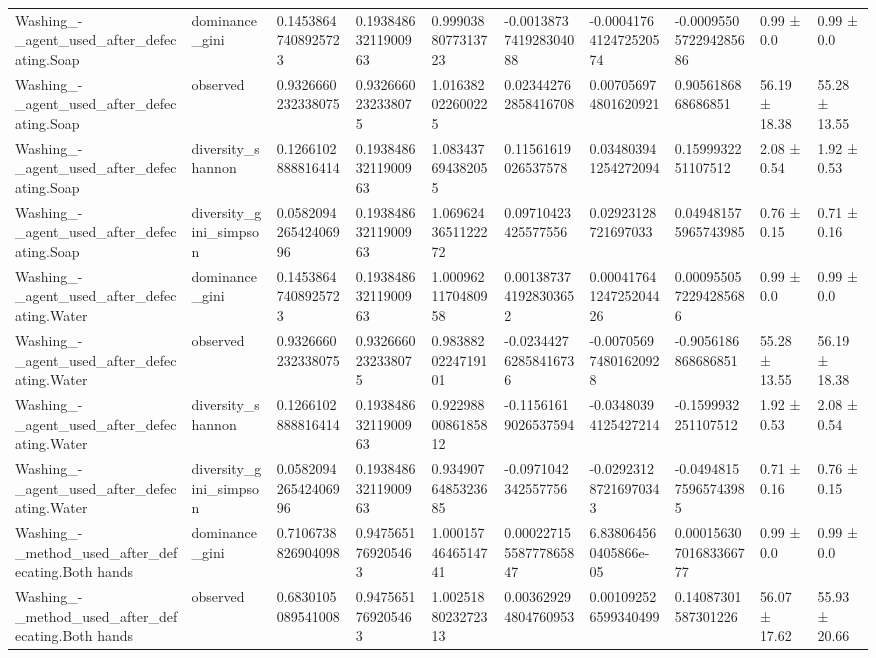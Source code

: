 \begin{longtable}{llllllllll}
Washing\_-\_agent\_used\_after\_defecating.Soap & dominance\_gini & 0.14538647408925723 & 0.19384863211900963 & 0.9990388077313723 & -0.0013873741928304088 & -0.0004176412472520574 & -0.0009550572294285686 & 0.99 ± 0.0 & 0.99 ± 0.0 \\
Washing\_-\_agent\_used\_after\_defecating.Soap & observed & 0.9326660232338075 & 0.9326660232338075 & 1.016382022600225 & 0.023442762858416708 & 0.007056974801620921 & 0.9056186868686851 & 56.19 ± 18.38 & 55.28 ± 13.55 \\
Washing\_-\_agent\_used\_after\_defecating.Soap & diversity\_shannon & 0.1266102888816414 & 0.19384863211900963 & 1.083437694382055 & 0.11561619026537578 & 0.034803941254272094 & 0.1599932251107512 & 2.08 ± 0.54 & 1.92 ± 0.53 \\
Washing\_-\_agent\_used\_after\_defecating.Soap & diversity\_gini\_simpson & 0.058209426542406996 & 0.19384863211900963 & 1.0696243651122272 & 0.09710423425577556 & 0.02923128721697033 & 0.049481575965743985 & 0.76 ± 0.15 & 0.71 ± 0.16 \\
Washing\_-\_agent\_used\_after\_defecating.Water & dominance\_gini & 0.14538647408925723 & 0.19384863211900963 & 1.0009621170480958 & 0.0013873741928303652 & 0.00041764124725204426 & 0.0009550572294285686 & 0.99 ± 0.0 & 0.99 ± 0.0 \\
Washing\_-\_agent\_used\_after\_defecating.Water & observed & 0.9326660232338075 & 0.9326660232338075 & 0.9838820224719101 & -0.023442762858416736 & -0.007056974801620928 & -0.9056186868686851 & 55.28 ± 13.55 & 56.19 ± 18.38 \\
Washing\_-\_agent\_used\_after\_defecating.Water & diversity\_shannon & 0.1266102888816414 & 0.19384863211900963 & 0.9229880086185812 & -0.11561619026537594 & -0.03480394125427214 & -0.1599932251107512 & 1.92 ± 0.53 & 2.08 ± 0.54 \\
Washing\_-\_agent\_used\_after\_defecating.Water & diversity\_gini\_simpson & 0.058209426542406996 & 0.19384863211900963 & 0.9349076485323685 & -0.0971042342557756 & -0.029231287216970343 & -0.049481575965743985 & 0.71 ± 0.16 & 0.76 ± 0.15 \\
Washing\_-\_method\_used\_after\_defecating.Both hands & dominance\_gini & 0.7106738826904098 & 0.9475651769205463 & 1.0001574646514741 & 0.00022715558777865847 & 6.838064560405866e-05 & 0.00015630701683366777 & 0.99 ± 0.0 & 0.99 ± 0.0 \\
Washing\_-\_method\_used\_after\_defecating.Both hands & observed & 0.6830105089541008 & 0.9475651769205463 & 1.0025188023272313 & 0.003629294804760953 & 0.001092526599340499 & 0.14087301587301226 & 56.07 ± 17.62 & 55.93 ± 20.66 \\

\end{longtable}
